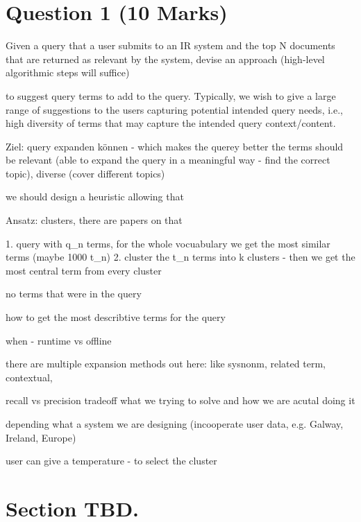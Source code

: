 \setcounter{page}{1}
\pagestyle{fancy}
\fancyhead[L]{\myassignment  \hspace*{1.5mm}- \mycourse} 
\fancyhead[R]{\mydate}


\section{Question 1 (10 Marks)}
Given a query that a user submits to an IR system and the top N documents
that are returned as relevant by the system, devise an approach (high-level
algorithmic steps will suffice)

to suggest query terms to add to the query. Typically, we wish to give a
large range of suggestions to the users capturing potential intended query
needs, i.e., high diversity of terms that may capture the intended query
context/content.


Ziel: query expanden können - which makes the querey better 
the terms should be relevant (able to expand the query in a meaningful way - find the correct topic), diverse (cover different topics)

we should design a heuristic allowing that

Ansatz: 
clusters, there are papers on that 



1. query with q\_n terms, for the whole vocuabulary we get the most similar terms (maybe 1000 t\_n)
2. cluster the t\_n terms into k clusters - then we get the most central term from every cluster

no terms that were in the query 

how to get the most describtive terms for the query 


when - runtime vs offline


there are multiple expansion methods out here: 
like sysnonm,  related term, contextual, 

recall vs precision tradeoff what we trying to solve and how we are acutal doing it

depending what a system we are designing (incooperate user data, e.g. Galway, Ireland, Europe)

user can give a temperature - to select the cluster

\section{Section TBD.}
\lipsum[1-4]


